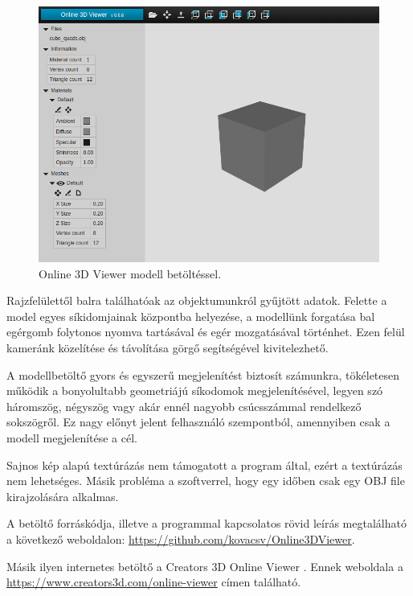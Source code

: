 \begin{figure}[h]
\centering
\includegraphics[width=\textwidth]{images/Model_Viewer_2.png}
\caption{Online 3D Viewer modell betöltéssel.}
\label{fig:model_viewer2}
\end{figure}

Rajzfelülettől balra találhatóak az objektumunkról gyűjtött adatok. Felette a model egyes síkidomjainak központba helyezése, a modellünk forgatása bal egérgomb folytonos nyomva tartásával és egér mozgatásával történhet. Ezen felül kameránk közelítése és távolítása görgő segítségével kivitelezhető.

A modellbetöltő gyors és egyszerű megjelenítést biztosít számunkra, tökéletesen működik a bonyolultabb geometriájú síkodomok megjelenítésével, legyen szó háromszög, négyszög vagy akár ennél nagyobb csúcsszámmal rendelkező sokszögről. Ez nagy előnyt jelent felhasználó szempontból, amennyiben csak a modell megjelenítése a cél.

Sajnos kép alapú textúrázás nem támogatott a program által, ezért a textúrázás nem lehetséges. Másik probléma a szoftverrel, hogy egy időben csak egy OBJ file kirajzolására alkalmas.

A betöltő forráskódja, illetve a programmal kapcsolatos rövid leírás megtalálható a következő weboldalon: \url{https://github.com/kovacsv/Online3DViewer}.
\newpage
{}

Másik ilyen internetes betöltő a Creators 3D Online Viewer \cite{creators2018creators3d}.
Ennek weboldala a  \url{https://www.creators3d.com/online-viewer} címen található.

